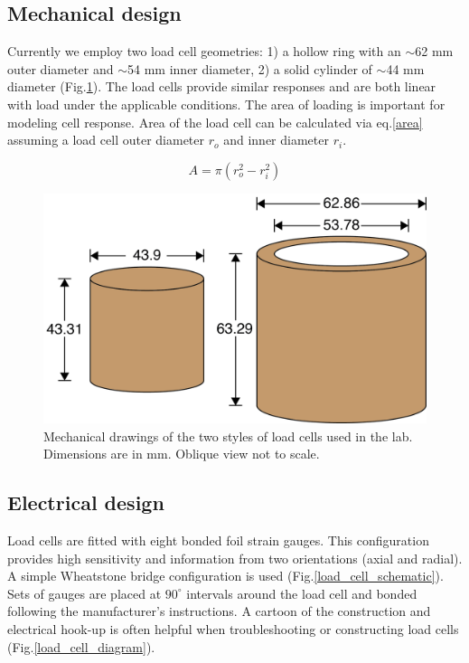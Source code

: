 \subsection{Mechanical design}
Currently we employ two load cell geometries: 1) a hollow ring with an
$\sim$62 mm outer diameter and $\sim$54 mm inner diameter, 2) a solid cylinder of $\sim$44 mm
diameter (Fig.\ref{load_cell_mechanical}). The load cells provide similar responses and are both linear with load under the applicable
conditions. The area of loading is important for modeling cell response. Area of the load cell can be 
calculated via eq.\ref{area} assuming a load cell outer diameter $r_o$ and inner diameter $r_i$.

\begin{equation}
	A = \pi(r_o^2-r_i^2)
	\label{area}
\end{equation}

\begin{figure}
	\centering
		\includegraphics[scale=0.6]{appendix_load_response/load_cell_mechanical.png}
   	\caption{Mechanical drawings of the two styles of load cells used in the lab. Dimensions are in mm. Oblique view not to scale.}
  	\label{load_cell_mechanical}
\end{figure}

\subsection{Electrical design}

Load cells are fitted with eight bonded foil strain gauges. This configuration provides high sensitivity and information from two orientations (axial and radial). A simple Wheatstone bridge configuration is used (Fig.\ref{load_cell_schematic}). Sets of gauges are placed at $90^\circ$ intervals around the load cell and bonded following the manufacturer's instructions. A cartoon of the construction and electrical hook-up is often helpful when troubleshooting or constructing load cells (Fig.\ref{load_cell_diagram}).  

